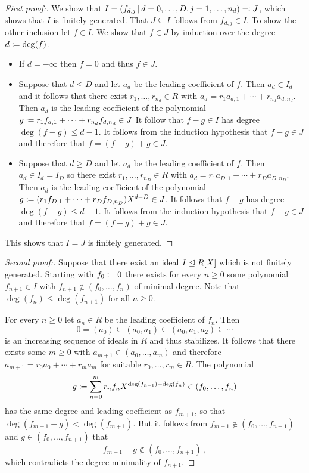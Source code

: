 \begin{proof}[First proof:]
  We show that $I = (f_{d,j} \suchthat d = 0, \dotsc, D, j = 1, \dotsc, n_d) \defines J$, which shows that $I$ is finitely generated.
  That $J \subseteq I$ follows from $f_{d,j} \in I$.
  To show the other inclusion let $f \in I$.
  We show that $f \in J$ by induction over the degree $d \coloneqq \deg(f)$.
  \begin{itemize}
    \item
      If $d = -\infty$ then $f = 0$ and thus $f \in J$.
    \item
      Suppose that $d \leq D$ and let $a_d$ be the leading coefficient of $f$.
      Then $a_d \in I_d$ and it follows that there exist $r_1, \dotsc, r_{n_d} \in R$ with $a_d = r_1 a_{d,1} + \dotsb + r_{n_d} a_{d,n_d}$.
      Then $a_d$ is the leading coefficient of the polynomial $g \coloneqq r_1 f_{d,1} + \dotsb + r_{n_d} f_{d,n_d} \in J$
      It follow that $f - g \in I$ has degree $\deg(f - g) \leq d-1$.
      It follows from the induction hypothesis that $f - g \in J$ and therefore that $f = (f-g) + g \in J$.
    \item
      Suppose that $d \geq D$ and let $a_d$ be the leading coefficient of $f$.
      Then $a_d \in I_d = I_D$ so there exist $r_1, \dotsc, r_{n_D} \in R$ with $a_d = r_1 a_{D,1} + \dotsb + r_D a_{D, n_D}$.
      Then $a_d$ is the leading coefficient of the polynomial $g \coloneqq (r_1 f_{D,1} + \dotsb + r_D f_{D,n_D}) X^{d-D} \in J$.
      It follows that $f - g$ has degree $\deg(f - g) \leq d-1$.
      It follows from the induction hypothesis that $f - g \in J$ and therefore that $f = (f-g) + g \in J$.
  \end{itemize}
  This shows that $I = J$ is finitely generated.
\end{proof}


\begin{proof}[Second proof:]
  Suppose that there exist an ideal $I \trianglelefteq R[X]$ which is not finitely generated.
  Starting with $f_0 \coloneqq 0$ there exists for every $n \geq 0$ some polynomial $f_{n+1} \in I$ with $f_{n+1} \notin (f_0, \dotsc, f_n)$ of minimal degree.
  Note that $\deg(f_n) \leq \deg(f_{n+1})$ for all $n \geq 0$.
  
  For every $n \geq 0$ let $a_n \in R$ be the leading coefficient of $f_n$.
  Then
  \[
              0
    =         (a_0)
    \subseteq (a_0, a_1)
    \subseteq (a_0, a_1, a_2)
    \subseteq \dotsb
  \]
  is an increasing sequence of ideals in $R$ and thus stabilizes.
  It follows that there exists some $m \geq 0$ with $a_{m+1} \in (a_0, \dotsc, a_m)$ and therefore $a_{m+1} = r_0 a_0 + \dotsb + r_m a_m$ for suitable $r_0, \dotsc, r_m \in R$.
  The polynomial
  \[
              g
    \coloneqq  \sum_{n=0}^m r_n f_n X^{\deg(f_{n+1}) - \deg(f_n)}
    \in       (f_0, \dotsc, f_n)
  \]
  has the same degree and leading coefficient as $f_{m+1}$, so that $\deg(f_{m+1} - g) < \deg(f_{m+1})$.
  But it follows from $f_{m+1} \notin (f_0, \dotsc, f_{n+1})$ and $g \in (f_0, \dotsc, f_{n+1})$ that
  \[
            f_{m+1} - g
    \notin  (f_0, \dotsc, f_{n+1}) \,,
  \]
  which contradicts the degree-minimality of $f_{n+1}$.
\end{proof}


